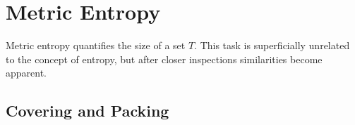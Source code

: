 \documentclass[12pt, twoside]{article}
\newcommand{\1}{\mathbb{1}}
\begin{document}
\section{Metric Entropy}
Metric entropy quantifies the size of a set $T$. This task is superficially unrelated to the concept of entropy, but after closer inspections similarities become apparent.

\subsection{Covering and Packing}


\clearpage
 
{}
\nocite{maierhoferCoFD}

\end{document}
